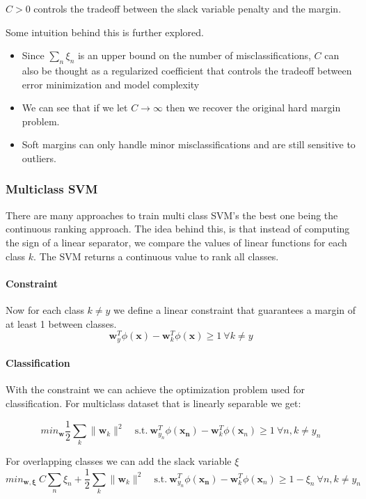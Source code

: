 \documentclass[12pt]{article}
\begin{document}
            $C > 0$ controls the tradeoff between the slack variable penalty and the margin. 
            
            
            Some intuition behind this is further explored. 
            \begin{itemize}
                \item Since $\sum_n \xi_n$ is an upper bound on the number of 
                misclassifications, $C$ can also be thought as a regularized coefficient that controls the tradeoff between 
                error minimization and model complexity
                \item We can see that if we let $C \rightarrow \infty$ then we recover the
                original hard margin problem.
                \item Soft margins can only handle minor misclassifications and are still sensitive 
                to outliers.
            \end{itemize}        
        
        
        \subsubsection{Multiclass SVM}
            There are many approaches to train multi class SVM's the best one being the continuous ranking approach. The
            idea behind this, is that instead of computing the sign of a linear separator, we compare the values of linear
            functions for each class $k$. The SVM returns a continuous value to rank all classes.

            \paragraph{Constraint}
            Now for each class $k \neq y$ we define a linear constraint that guarantees a margin of at least 1 between classes.
            $$ \boldsymbol{w}^T_y \phi(\boldsymbol{x}) - \boldsymbol{w}^T_k\phi(\boldsymbol{x}) \geq 1 \ \forall k \neq
            y $$

            \paragraph{Classification}
            With the constraint we can achieve the optimization problem used for classification. For multiclass dataset
            that is linearly separable we get:

            $$ min_{\boldsymbol{w}} \frac{1}{2} \sum_k \|\boldsymbol{w}_k \|^2 \quad \textrm{s.t.} \
            \boldsymbol{w}^T_{y_n} \phi(\boldsymbol{x_n}) - \boldsymbol{w}^T_k \phi(\boldsymbol{x}_n) \geq 1 \ 
            \forall n,k \neq y_n $$

            For overlapping classes we can add the slack variable $\xi$
            $$ min_{\boldsymbol{w}, \boldsymbol{\xi}} \ C \sum_n \xi_n + \frac{1}{2} \sum_k \|\boldsymbol{w}_k \|^2 \quad \textrm{s.t.} \
            \boldsymbol{w}^T_{y_n} \phi(\boldsymbol{x_n}) - \boldsymbol{w}^T_k \phi(\boldsymbol{x}_n) \geq 1 - \xi_n \ 
            \forall n,k \neq y_n $$

\printindex
\end{document}
